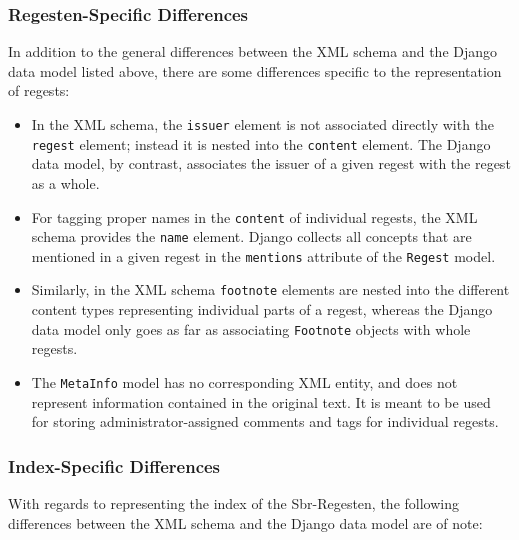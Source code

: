 \subsubsection{Regesten-Specific Differences}
\label{sec:reg-model}

In addition to the general differences between the XML schema and the
Django data model listed above, there are some differences specific to
the representation of regests:

\begin{itemize}
\item In the XML schema, the \texttt{issuer} element is not associated
  directly with the \texttt{regest} element; instead it is nested into
  the \texttt{content} element. The Django data model, by contrast,
  associates the issuer of a given regest with the regest as a whole.
\item For tagging proper names in the \texttt{content} of individual
  regests, the XML schema provides the \texttt{name} element. Django
  collects all concepts that are mentioned in a given regest in the
  \texttt{mentions} attribute of the \texttt{Regest} model.
\item Similarly, in the XML schema \texttt{footnote} elements are
  nested into the different content types representing individual
  parts of a regest, whereas the Django data model only goes as far as
  associating \texttt{Footnote} objects with whole regests.
\item The \texttt{MetaInfo} model has no corresponding XML entity, and
  does not represent information contained in the original text. It is
  meant to be used for storing administrator-assigned comments and
  tags for individual regests.
\end{itemize}

\subsubsection{Index-Specific Differences}
\label{sec:index-model}

With regards to representing the index of the Sbr-Regesten, the
following differences between the XML schema and the Django data model
are of note:


